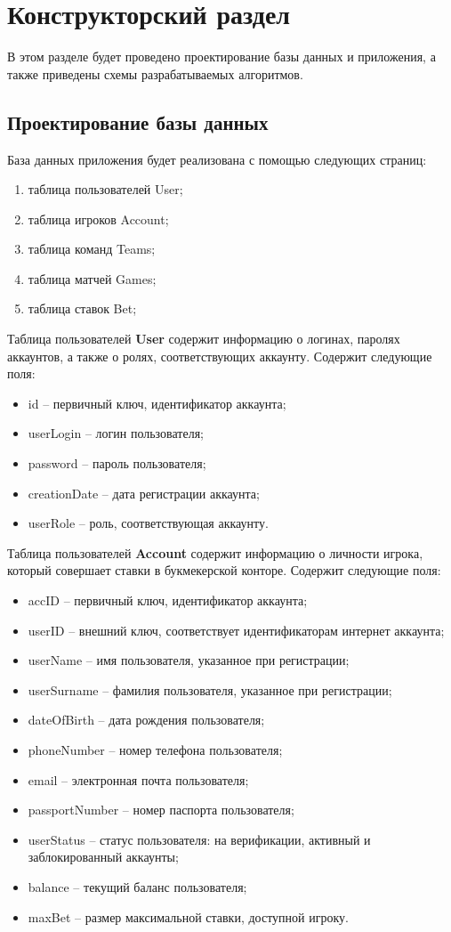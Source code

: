 \section{Конструкторский раздел}
В этом разделе будет проведено проектирование базы данных и приложения, а также приведены схемы разрабатываемых алгоритмов.

\subsection{Проектирование базы данных}
База данных приложения будет реализована с помощью следующих страниц:
\begin{enumerate}
	\item таблица пользователей User;
	\item таблица игроков Account;
	\item таблица команд Teams;
	\item таблица матчей Games;
	\item таблица ставок Bet;
\end{enumerate}

Таблица пользователей \textbf{User} содержит информацию о логинах, паролях аккаунтов, а также о ролях, соответствующих аккаунту.
Содержит следующие поля:
\begin{itemize}
	\item id -- первичный ключ, идентификатор аккаунта;
	\item userLogin -- логин пользователя;
	\item password -- пароль пользователя;
	\item creationDate -- дата регистрации аккаунта;
	\item userRole -- роль, соответствующая аккаунту.
\end{itemize}

Таблица пользователей \textbf{Account} содержит информацию о личности игрока, который совершает ставки в букмекерской конторе.
Содержит следующие поля:
\begin{itemize}
	\item accID -- первичный ключ, идентификатор аккаунта;
	\item userID -- внешний ключ, соответствует идентификаторам интернет аккаунта;
	\item userName -- имя пользователя, указанное при регистрации;
	\item userSurname -- фамилия пользователя, указанное при регистрации;
	\item dateOfBirth -- дата рождения пользователя;
	\item phoneNumber -- номер телефона пользователя;
	\item email -- электронная почта пользователя;
	\item passportNumber -- номер паспорта пользователя;
	\item userStatus -- статус пользователя: на верификации, активный и заблокированный аккаунты;
	\item balance -- текущий баланс пользователя;
	\item maxBet -- размер максимальной ставки, доступной игроку.
\end{itemize}

